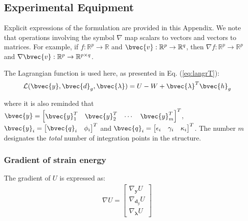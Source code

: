 \begin{appendices}



\chapter{Experimental Equipment}\label{appendix:A}

Explicit expressions of the formulation are provided in this
Appendix. We note that operations involving the symbol $\nabla$ map scalars to
vectors and vectors to matrices. For example, if $f:\mathbb{R}^p\rightarrow 
\mathbb{R}$ and
$\bvec{v}:\mathbb{R}^p\rightarrow\mathbb{R}^q$, then $\nabla
f:\mathbb{R}^p\rightarrow\mathbb{R}^p$ and
$\nabla\bvec{v}:\mathbb{R}^p\rightarrow\mathbb{R}^{p\times q}$.

The Lagrangian function is used here, as presented in Eq.
(\ref{eq:langrT}):
\begin{gather}
	\mathcal{L}(\bvec{y}, \bvec{d}_g,\bvec{\lambda}) =
	U-W+\bvec{\lambda}^T\bvec{h}_g
	\label{eq:globalL}
\end{gather}

\noindent where it is also reminded that $\bvec{y} = \begin{bmatrix}
	\bvec{y}_1^T & \bvec{y}_2^T & \cdots & \bvec{y}_m^T
\end{bmatrix}^T$, $\bvec{y}_i = \begin{bmatrix}
	\bvec{q}_i & \phi_i
\end{bmatrix}^T$ and $\bvec{q}_i = \begin{bmatrix}
	\epsilon_i & \gamma_i & \kappa_i
\end{bmatrix}^T$. The number $m$ designates the \emph{total} number of
integration points in the structure.

\subsection{Gradient of strain energy}
The gradient of $U$ is expressed as:
\begin{gather}
	\nabla U = \begin{bmatrix}
		\nabla_{\mathbf{y}}U\\ \nabla_{\mathbf{d}_g}U\\ 
		\nabla_{\mathbf{\lambda}}U
	\end{bmatrix}\nonumber
\end{gather}


\end{appendices}
